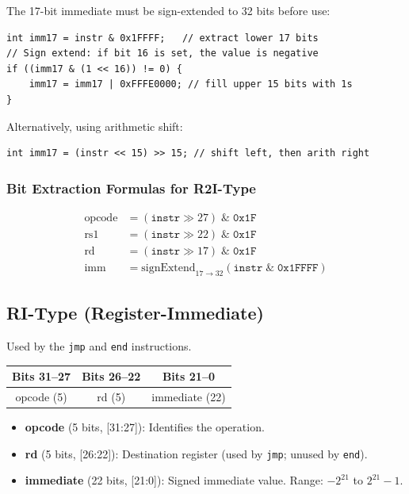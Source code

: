 \documentclass[12pt,a4paper]{article}
\begin{document}
The 17-bit immediate must be sign-extended to 32 bits before use:

\begin{lstlisting}[style=javastyle, caption={Sign extension of 17-bit immediate}]
int imm17 = instr & 0x1FFFF;   // extract lower 17 bits
// Sign extend: if bit 16 is set, the value is negative
if ((imm17 & (1 << 16)) != 0) {
    imm17 = imm17 | 0xFFFE0000; // fill upper 15 bits with 1s
}
\end{lstlisting}

Alternatively, using arithmetic shift:
\begin{lstlisting}[style=javastyle]
int imm17 = (instr << 15) >> 15; // shift left, then arith right
\end{lstlisting}

\subsubsection{Bit Extraction Formulas for R2I-Type}

\begin{align}
\text{opcode} &= (\texttt{instr} \gg 27) \;\&\; \texttt{0x1F} \\
\text{rs1} &= (\texttt{instr} \gg 22) \;\&\; \texttt{0x1F} \\
\text{rd} &= (\texttt{instr} \gg 17) \;\&\; \texttt{0x1F} \\
\text{imm} &= \text{signExtend}_{17 \to 32}(\texttt{instr} \;\&\; \texttt{0x1FFFF})
\end{align}

\subsection{RI-Type (Register-Immediate)}

Used by the \texttt{jmp} and \texttt{end} instructions.

\begin{center}
\begin{tabular}{|c|c|c|}
\hline
\textbf{Bits 31--27} & \textbf{Bits 26--22} & \textbf{Bits 21--0} \\
\hline
opcode (5) & rd (5) & immediate (22) \\
\hline
\end{tabular}
\end{center}

\begin{itemize}
    \item \textbf{opcode} (5 bits, [31:27]): Identifies the operation.
    \item \textbf{rd} (5 bits, [26:22]): Destination register (used by \texttt{jmp}; unused by \texttt{end}).
    \item \textbf{immediate} (22 bits, [21:0]): Signed immediate value. Range: $-2^{21}$ to $2^{21} - 1$.
\end{itemize}
\end{document}
